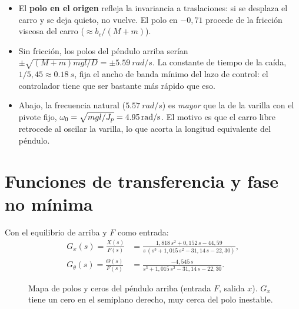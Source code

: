 \begin{itemize}
  \item El \textbf{polo en el origen} refleja la invariancia a traslaciones: si se desplaza el carro y se deja quieto, no vuelve. El polo en $-0{,}71$ procede de la fricción viscosa del carro ($\approx b_c/(M+m)$).
  \item Sin fricción, los polos del péndulo arriba serían $\pm\sqrt{(M+m)mgl/D}=\pm\SI{5.59}{rad/s}$. La constante de tiempo de la caída, $1/5{,}45\approx\SI{0.18}{s}$, fija el ancho de banda mínimo del lazo de control: el controlador tiene que ser bastante más rápido que eso.
  \item Abajo, la frecuencia natural ($\SI{5.57}{rad/s}$) es \emph{mayor} que la de la varilla con el pivote fijo, $\omega_0=\sqrt{mgl/J_p}=\SI{4.95}{rad/s}$. El motivo es que el carro libre retrocede al oscilar la varilla, lo que acorta la longitud equivalente del péndulo.
\end{itemize}

\section{Funciones de transferencia y fase no mínima}
\label{sec:fnm}

Con el equilibrio de arriba y $F$ como entrada:
\begin{align}
G_x(s)=\frac{X(s)}{F(s)} &= \frac{1{,}818\,s^2+0{,}152\,s-44{,}59}{s\,(s^3+1{,}015\,s^2-31{,}14\,s-22{,}30)},\\[2pt]
G_\theta(s)=\frac{\Theta(s)}{F(s)} &= \frac{-4{,}545\,s}{s^3+1{,}015\,s^2-31{,}14\,s-22{,}30}.
\end{align}

\begin{figure}[H]
\centering
{}
\caption{Mapa de polos y ceros del péndulo arriba (entrada $F$, salida $x$). $G_x$ tiene un cero en el semiplano derecho, muy cerca del polo inestable.}
\label{fig:pz}
\end{figure}

